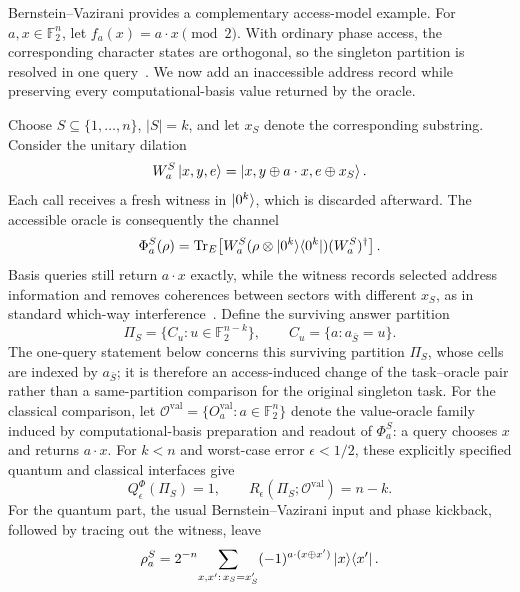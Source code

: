 \documentclass[
  aps,
  prl,
  reprint,
  nofootinbib
]{revtex4-2}
\begin{document}
Bernstein--Vazirani provides a complementary access-model example. For
\(a,x\in\mathbb F_2^n\), let \(f_a(x)=a\cdot x \pmod2\). With ordinary phase
access, the corresponding character states are orthogonal, so the singleton
partition is resolved in one query~\cite{be-va}. We now add an inaccessible
address record while preserving every computational-basis value returned by
the oracle.

Choose \(S\subseteq\{1,\ldots,n\}\), \(|S|=k\), and let \(x_S\) denote
the corresponding substring. Consider the unitary dilation
\begin{equation}
 W_a^S\ket{x,y,e}
 =\ket{x,y\oplus a\cdot x,e\oplus x_S}.
 \label{eq:witness-unitary}
\end{equation}
Each call receives a fresh witness in \(\ket{0^k}\), which is discarded
afterward. The accessible oracle is consequently the channel
\begin{equation}
 \Phi_a^S(\rho)=\operatorname{Tr}_E\!\left[
 W_a^S(\rho\otimes\ket{0^k}\!\bra{0^k})(W_a^S)^\dagger
 \right].
 \label{eq:witness-channel}
\end{equation}
Basis queries still return \(a\cdot x\) exactly, while the witness records
selected address information and removes coherences between sectors with
different \(x_S\), as in standard which-way
interference~\cite{Englert1996}. Define the surviving answer partition
\begin{equation}
 \Pi_S=\{C_u:u\in\mathbb F_2^{n-k}\},\qquad
 C_u=\{a:a_{\bar S}=u\}.
 \label{eq:surviving-partition}
\end{equation}
The one-query statement below concerns this surviving partition \(\Pi_S\),
whose cells are indexed by \(a_{\bar S}\); it is therefore an
access-induced change of the task--oracle pair rather than a
same-partition comparison for the original singleton task. For the classical
comparison, let \(\mathcal O^{\mathrm{val}}=\{O_a^{\mathrm{val}}:a\in
\mathbb F_2^n\}\) denote the value-oracle family induced by
computational-basis preparation and readout of \(\Phi_a^S\): a query chooses
\(x\) and returns \(a\cdot x\). For \(k<n\) and worst-case error
\(\epsilon<1/2\), these explicitly specified quantum and classical interfaces
give
\begin{equation}
 Q_\epsilon^{\Phi}(\Pi_S)=1,\qquad
 R_\epsilon(\Pi_S;\mathcal O^{\mathrm{val}})=n-k.
 \label{eq:partition-speedup}
\end{equation}
For the quantum part, the usual Bernstein--Vazirani input and phase kickback,
followed by tracing out the witness, leave
\begin{equation}
 \rho_a^S=2^{-n}\!\sum_{x,x':\,x_S=x'_S}
 (-1)^{a\cdot(x\oplus x')}\ket x\!\bra{x'}.
 \label{eq:reduced-bv}
\end{equation}
\end{document}
